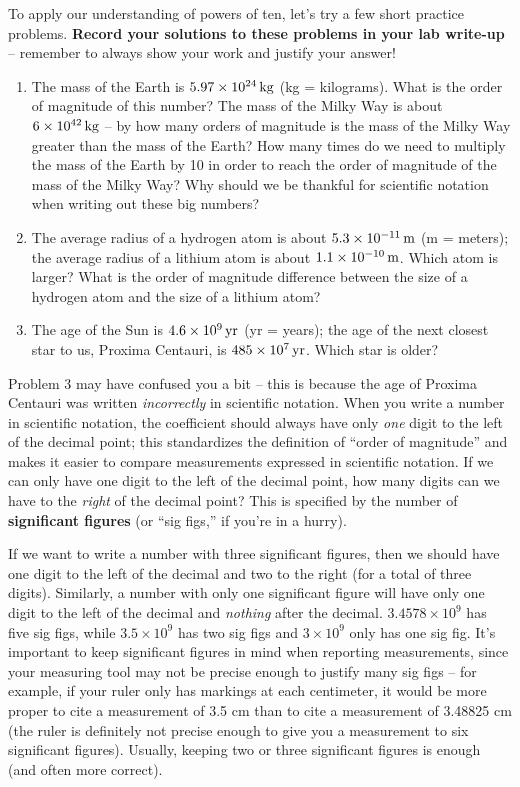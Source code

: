 \documentclass[11pt]{article}
\begin{document}
\bigskip

To apply our understanding of powers of ten, let's try a few short practice problems. \textbf{Record your solutions to these problems in your lab write-up} -- remember to always show your work and justify your answer!
\begin{enumerate}
    \item The mass of the Earth is $5.97 \times 10^{24} \, {\rm kg}$ (kg = kilograms). What is the order of magnitude of this number? The mass of the Milky Way is about $6 \times 10^{42} \, {\rm kg}$ -- by how many orders of magnitude is the mass of the Milky Way greater than the mass of the Earth? How many times do we need to multiply the mass of the Earth by 10 in order to reach the order of magnitude of the mass of the Milky Way? Why should we be thankful for scientific notation when writing out these big numbers?
    
    \item The average radius of a hydrogen atom is about $5.3 \times 10^{-11} \, {\rm m}$ (m = meters); the average radius of a lithium atom is about $1.1 \times 10^{-10} \, {\rm m}$. Which atom is larger? What is the order of magnitude difference between the size of a hydrogen atom and the size of a lithium atom? 
    
    \item The age of the Sun is $4.6 \times 10^9 \, {\rm yr}$ (yr = years); the age of the next closest star to us, Proxima Centauri, is $485 \times 10^{7} \, {\rm yr}$. Which star is older? 
\end{enumerate}

\bigskip

Problem 3 may have confused you a bit -- this is because the age of Proxima Centauri was written \emph{incorrectly} in scientific notation. When you write a number in scientific notation, the coefficient should always have only \emph{one} digit to the left of the decimal point; this standardizes the definition of ``order of magnitude'' and makes it easier to compare measurements expressed in scientific notation. If we can only have one digit to the left of the decimal point, how many digits can we have to the \emph{right} of the decimal point? This is specified by the number of \textbf{significant figures} (or ``sig figs,'' if you're in a hurry). 

If we want to write a number with three significant figures, then we should have one digit to the left of the decimal and two to the right (for a total of three digits). Similarly, a number with only one significant figure will have only one digit to the left of the decimal and \emph{nothing} after the decimal. $3.4578 \times 10^9$ has five sig figs, while $3.5 \times 10^9$ has two sig figs and $3 \times 10^9$ only has one sig fig. It's important to keep significant figures in mind when reporting measurements, since your measuring tool may not be precise enough to justify many sig figs -- for example, if your ruler only has markings at each centimeter, it would be more proper to cite a measurement of 3.5 cm than to cite a measurement of 3.48825 cm (the ruler is definitely not precise enough to give you a measurement to six significant figures). Usually, keeping two or three significant figures is enough (and often more correct).
\end{document}
